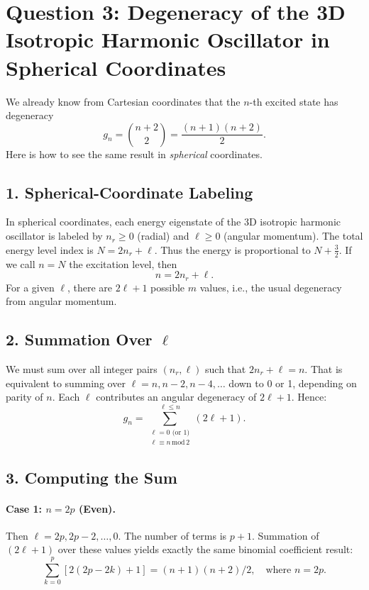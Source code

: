 \documentclass[12pt]{article}
\begin{document}
\section*{Question 3: Degeneracy of the 3D Isotropic Harmonic Oscillator in Spherical Coordinates}

We already know from Cartesian coordinates that the $n$-th excited state has degeneracy
\begin{equation}
\label{eq:cartesian-deg}
 g_n = \binom{n+2}{2} = \frac{(n+1)(n+2)}{2}.
\end{equation}
Here is how to see the same result in \emph{spherical} coordinates.

\subsection*{1. Spherical-Coordinate Labeling}
In spherical coordinates, each energy eigenstate of the 3D isotropic harmonic oscillator is labeled by \(n_r\ge 0\) (radial) and \(\ell\ge 0\) (angular momentum). The total energy level index is \(N = 2n_r + \ell\). Thus the energy is proportional to \(N + \tfrac32\). If we call \(n = N\) the excitation level, then
\begin{equation}
 n = 2n_r + \ell.
\end{equation}
For a given \(\ell\), there are \(2\ell + 1\) possible \(m\) values, i.e., the usual degeneracy from angular momentum.

\subsection*{2. Summation Over $\ell$}
We must sum over all integer pairs \((n_r,\ell)\) such that \(2n_r + \ell = n\). That is equivalent to summing over \(\ell = n, n-2, n-4, \dots\) down to 0 or 1, depending on parity of \(n\). Each \(\ell\) contributes an angular degeneracy of \(2\ell + 1\). Hence:
\begin{equation}
\label{eq:spherical-deg}
 g_n = \sum_{\substack{\ell=0\text{ (or 1)}\\\ell\equiv n\,\mathrm{mod}\,2}}^{\ell\le n} (2\ell + 1).
\end{equation}

\subsection*{3. Computing the Sum}
\paragraph{Case 1: $n=2p$ (Even).}\quad Then \(\ell = 2p, 2p-2, \dots, 0\). The number of terms is \(p+1\). Summation of \((2\ell + 1)\) over these values yields exactly the same binomial coefficient result:
\[
\sum_{k=0}^{p} [2(2p - 2k) + 1] = (n+1)(n+2)/2, \quad\text{where }n=2p.
\]
\end{document}
